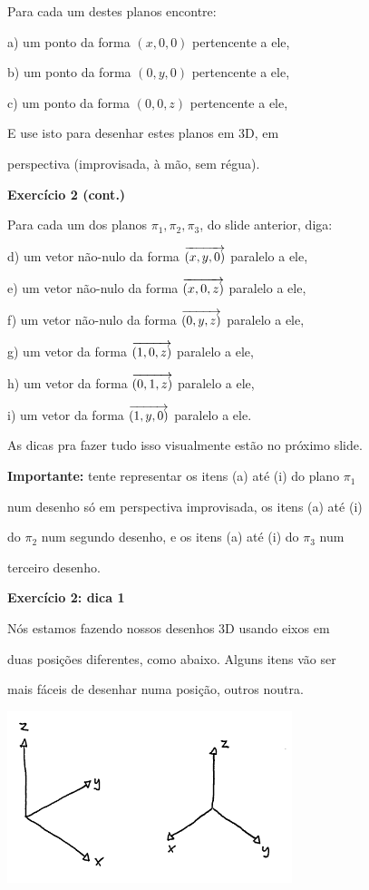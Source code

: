 \documentclass[oneside,12pt]{article}
\begin{document}
Para cada um destes planos encontre:

a) um ponto da forma $(x,0,0)$ pertencente a ele,

b) um ponto da forma $(0,y,0)$ pertencente a ele,

c) um ponto da forma $(0,0,z)$ pertencente a ele,

E use isto para desenhar estes planos em 3D, em

perspectiva (improvisada, à mão, sem régua).

\newpage

{\bf Exercício 2 (cont.)}

Para cada um dos planos $π_1, π_2, π_3$, do slide anterior, diga:

d) um vetor não-nulo da forma ${\overrightarrow{(x,y,0)}}$ paralelo a ele,

e) um vetor não-nulo da forma ${\overrightarrow{(x,0,z)}}$ paralelo a ele,

f) um vetor não-nulo da forma ${\overrightarrow{(0,y,z)}}$ paralelo a ele,

g) um vetor da forma ${\overrightarrow{(1,0,z)}}$ paralelo a ele,

h) um vetor da forma ${\overrightarrow{(0,1,z)}}$ paralelo a ele,

i) um vetor da forma ${\overrightarrow{(1,y,0)}}$ paralelo a ele.

\msk

As dicas pra fazer tudo isso visualmente estão no próximo slide.

\msk

{\bf Importante:} tente representar os itens (a) até (i) do plano
$π_1$

num desenho só em perspectiva improvisada, os itens (a) até (i)

do $π_2$ num segundo desenho, e os itens (a) até (i) do $π_3$ num

terceiro desenho.


\newpage

{\bf Exercício 2: dica 1}

Nós estamos fazendo nossos desenhos 3D usando eixos em

duas posições diferentes, como abaixo. Alguns itens vão ser

mais fáceis de desenhar numa posição, outros noutra.

\includegraphics[height=5cm]{2020-2-C3/20210407_eixos.pdf}
\end{document}
